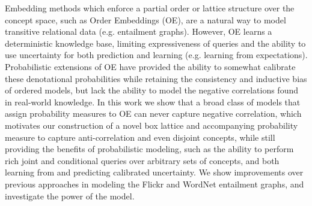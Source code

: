 Embedding methods which enforce a partial order or lattice structure over the concept space, such as Order Embeddings (OE), are a natural way to model transitive relational data (e.g. entailment graphs). However, OE learns a deterministic knowledge base, limiting expressiveness of queries and the ability to use uncertainty  for both prediction and learning (e.g. learning from expectations). Probabilistic extensions of OE  have provided the ability to somewhat calibrate these denotational probabilities while retaining the consistency and inductive bias of ordered models, but lack the ability to model the negative correlations found in real-world knowledge. In this work we show that a broad class of models that assign probability measures to OE can never capture negative correlation, which motivates our construction of a novel box lattice and accompanying probability measure to capture anti-correlation and even disjoint concepts, while still providing the benefits of probabilistic modeling, such as the ability to perform rich joint and conditional queries over arbitrary sets of concepts, and both learning from and predicting calibrated uncertainty. We show improvements over previous approaches in modeling the Flickr and WordNet entailment graphs, and investigate the power of the model.
